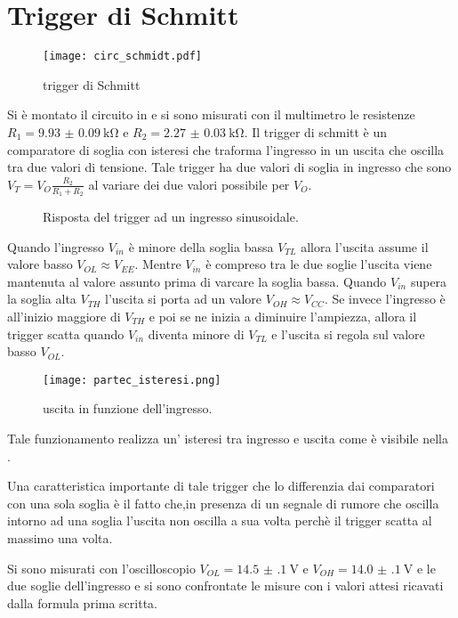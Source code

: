 \section{Trigger di Schmitt}

\begin{figure}[h]
	\centering
	\texttt{[image: circ\_schmidt.pdf]}
	\caption{trigger di Schmitt}
	\label{f:trigger}
\end{figure}

Si è montato il circuito in  e si sono misurati con il multimetro le resistenze $R_1= \SI{9.93(9)}{\kohm}$ e $R_2=\SI{2.27(3)}{\kohm}$. Il trigger di schmitt è un comparatore di soglia con isteresi che traforma l'ingresso in un uscita che oscilla tra due valori di tensione. Tale trigger ha due valori di soglia in ingresso che sono $V_{T}= V_{O}\frac{R_2}{R_1+R_2}$ al variare dei due valori possibile per $V_O$.

\begin{figure}[h]
	\centering
	\caption{Risposta del trigger ad un ingresso sinusoidale.}
	\label{f:sinusoide}
\end{figure}

Quando l'ingresso $V_{in}$ è minore della soglia bassa $V_{TL}$ allora l'uscita assume il valore basso $V_{OL} \approx V_{EE}$. Mentre $V_{in}$ è compreso tra le due soglie l'uscita viene mantenuta al valore assunto prima di varcare la soglia bassa. Quando $V_{in}$ supera la soglia alta $V_{TH}$ l'uscita si porta ad un valore $V_{OH} \approx V_{CC}$. 
Se invece l'ingresso è all'inizio maggiore di $V_{TH}$ e poi se ne inizia a diminuire l'ampiezza, allora il trigger scatta quando $V_{in}$ diventa minore di $V_{TL}$ e l'uscita si regola sul valore basso $V_{OL}$. 

\begin{figure}[h]
	\centering
	\texttt{[image: partec\_isteresi.png]}
	\caption{uscita in funzione dell'ingresso.}
	\label{f:isteresi}
\end{figure}
Tale funzionamento realizza un' isteresi tra ingresso e uscita come è visibile nella .

Una caratteristica importante di tale trigger che lo differenzia dai comparatori con una sola soglia è il fatto che,in presenza di un segnale di rumore che oscilla intorno ad una soglia l'uscita non oscilla a sua volta perchè il trigger scatta al massimo una volta.

Si sono misurati con l'oscilloscopio $V_{OL}= \SI{14.5(1)}{\V}$ e  $V_{OH}= \SI{14.0(1)}{\V}$ e le due soglie dell'ingresso e si sono confrontate le misure con i valori attesi ricavati dalla formula prima scritta.

